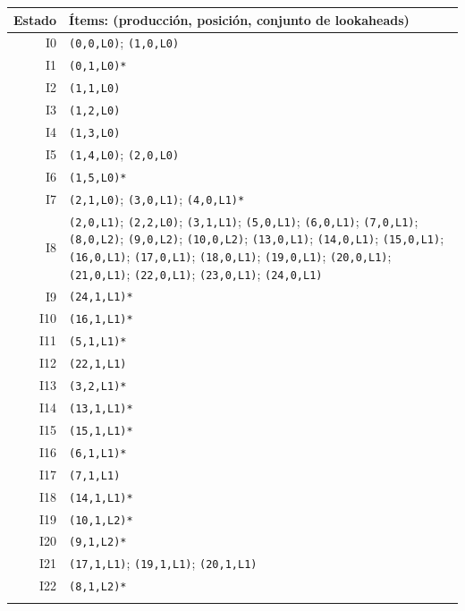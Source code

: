 {\small\begin{longtable}{@{}r p{14.7cm}@{}}\toprule Estado & Ítems: (producción, posición, conjunto de lookaheads)\\\midrule\endhead
I0 & \texttt{(0,0,L0)}; \texttt{(1,0,L0)}\\\addlinespace[3pt]
I1 & \texttt{(0,1,L0)*}\\\addlinespace[3pt]
I2 & \texttt{(1,1,L0)}\\\addlinespace[3pt]
I3 & \texttt{(1,2,L0)}\\\addlinespace[3pt]
I4 & \texttt{(1,3,L0)}\\\addlinespace[3pt]
I5 & \texttt{(1,4,L0)}; \texttt{(2,0,L0)}\\\addlinespace[3pt]
I6 & \texttt{(1,5,L0)*}\\\addlinespace[3pt]
I7 & \texttt{(2,1,L0)}; \texttt{(3,0,L1)}; \texttt{(4,0,L1)*}\\\addlinespace[3pt]
I8 & \texttt{(2,0,L1)}; \texttt{(2,2,L0)}; \texttt{(3,1,L1)}; \texttt{(5,0,L1)}; \texttt{(6,0,L1)}; \texttt{(7,0,L1)}; \texttt{(8,0,L2)}; \texttt{(9,0,L2)}; \texttt{(10,0,L2)}; \texttt{(13,0,L1)}; \texttt{(14,0,L1)}; \texttt{(15,0,L1)}; \texttt{(16,0,L1)}; \texttt{(17,0,L1)}; \texttt{(18,0,L1)}; \texttt{(19,0,L1)}; \texttt{(20,0,L1)}; \texttt{(21,0,L1)}; \texttt{(22,0,L1)}; \texttt{(23,0,L1)}; \texttt{(24,0,L1)}\\\addlinespace[3pt]
I9 & \texttt{(24,1,L1)*}\\\addlinespace[3pt]
I10 & \texttt{(16,1,L1)*}\\\addlinespace[3pt]
I11 & \texttt{(5,1,L1)*}\\\addlinespace[3pt]
I12 & \texttt{(22,1,L1)}\\\addlinespace[3pt]
I13 & \texttt{(3,2,L1)*}\\\addlinespace[3pt]
I14 & \texttt{(13,1,L1)*}\\\addlinespace[3pt]
I15 & \texttt{(15,1,L1)*}\\\addlinespace[3pt]
I16 & \texttt{(6,1,L1)*}\\\addlinespace[3pt]
I17 & \texttt{(7,1,L1)}\\\addlinespace[3pt]
I18 & \texttt{(14,1,L1)*}\\\addlinespace[3pt]
I19 & \texttt{(10,1,L2)*}\\\addlinespace[3pt]
I20 & \texttt{(9,1,L2)*}\\\addlinespace[3pt]
I21 & \texttt{(17,1,L1)}; \texttt{(19,1,L1)}; \texttt{(20,1,L1)}\\\addlinespace[3pt]
I22 & \texttt{(8,1,L2)*}\\\addlinespace[3pt]

\end{longtable}}
